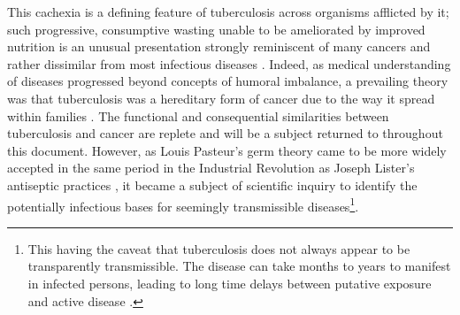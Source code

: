 This cachexia is a defining feature of tuberculosis across organisms afflicted by it; such progressive, consumptive wasting unable to be ameliorated by improved nutrition is an unusual presentation strongly reminiscent of many cancers and rather dissimilar from most infectious diseases \citep{Tisdale2002, Silva1988, Martignoni2003, Chang2013}. Indeed, as medical understanding of diseases progressed beyond concepts of humoral imbalance, a prevailing theory was that tuberculosis was a hereditary form of cancer due to the way it spread within families \citep{Frith2014}. The functional and consequential similarities between tuberculosis and cancer are replete and will be a subject returned to throughout this document. However, as Louis Pasteur's germ theory \citep{Smith2012} came to be more widely accepted in the same period in the Industrial Revolution as Joseph Lister's antiseptic practices \citep{ToledoPereyra2010}, it became a subject of scientific inquiry to identify the potentially infectious bases for seemingly transmissible diseases\footnote{This having the caveat that tuberculosis does not always appear to be transparently transmissible. The disease can take months to years to manifest in infected persons, leading to long time delays between putative exposure and active disease \citep{Behr2018}.}. 


